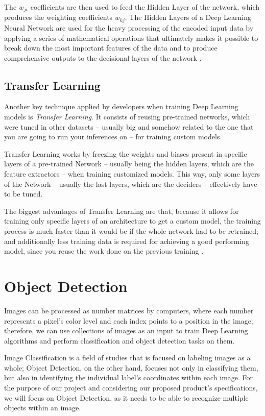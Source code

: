 \documentclass[openright]{normas-utf-tex} %
\begin{document}
The $w_{ji}$ coefficients are then used to feed the Hidden Layer of the network,
which produces the weighting coefficients $w_{kj}$. The Hidden Layers of a Deep Learning 
Neural Network are used for the heavy processing of the encoded input data by applying a series of 
mathematical operations that ultimately makes it possible to break down the most important features
of the data and to produce comprehensive outputs to the decisional layers of the network
\cite{DeepAI_HiddenLayer}.

\subsection{Transfer Learning}

Another key technique applied by developers when training Deep Learning models is
\textit{Transfer Learning}. 
It consists of reusing pre-trained networks, which were tuned in other datasets -- usually big and
somehow related to the one that you are going to run your inferences on -- for training custom models.

Transfer Learning works by freezing the weights and biases present in specific layers of a
pre-trained Network -- usually being the hidden layers, which are the feature extractors -- 
when training customized models. This way,  only some layers of the Network -- usually the last layers, which 
are the deciders -- effectively have to be tuned.

The biggest advantages of Transfer Learning are that, because it allows for
training only specific layers of an architecture to get a custom model, the
training process is much faster than it would be if the whole network had to be
retrained; and additionally less training data is required for achieving a good
performing model, since you reuse the work done on the previous training
\cite{CS231N}.

\section{Object Detection}

Images can be processed as number matrices by computers, where each number represents a 
pixel's color level and each index points to a position in the image;
therefore, we can use collections of images as an input to train Deep Learning algorithms 
and perform classification and object detection tasks on them. 

Image Classification is a field of studies that is focused on labeling images
as a whole; Object Detection, on the other hand, focuses not only in
classifying them, but also in identifying the individual label's coordinates
within each image. For the purpose of our project and considering our proposed
product's specifications, we will focus on Object Detection, as it needs to be
able to recognize multiple objects within an image. 
\end{document}
